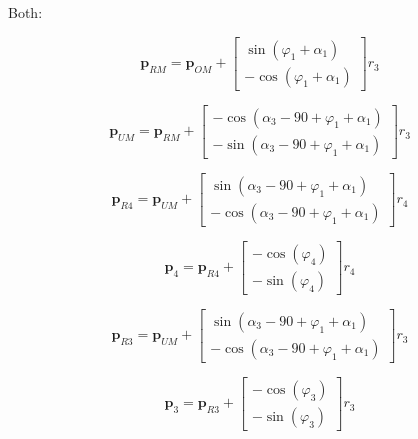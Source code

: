 \documentclass[letterpaper,10pt,conference]{ieeeconf}  %
\begin{document}
Both:

\begin{equation}
\bm{p}_{RM} = \bm{p}_{OM} + \begin{bmatrix} 
\sin(\varphi_1 + \alpha_1) \\ 
-\cos(\varphi_1 + \alpha_1) \end{bmatrix} r_3
\end{equation}


\begin{equation}
\bm{p}_{UM} = \bm{p}_{RM} + \begin{bmatrix} 
- \cos(\alpha_3 - 90 + \varphi_1 + \alpha_1) \\ 
- \sin(\alpha_3 - 90 + \varphi_1 + \alpha_1) \end{bmatrix} r_3
\end{equation}

\begin{equation}
\bm{p}_{R4} = \bm{p}_{UM} + \begin{bmatrix} 
\sin(\alpha_3 - 90 + \varphi_1 + \alpha_1) \\
- \cos(\alpha_3 - 90 + \varphi_1 + \alpha_1) \end{bmatrix} r_4
\end{equation}

\begin{equation}
\bm{p}_{4} = \bm{p}_{R4} + \begin{bmatrix} 
-\cos(\varphi_4) \\
-\sin(\varphi_4)\end{bmatrix} r_4
\end{equation}

\begin{equation}
\bm{p}_{R3} = \bm{p}_{UM} + \begin{bmatrix} 
\sin(\alpha_3 - 90 + \varphi_1 + \alpha_1) \\
 - \cos(\alpha_3 - 90 + \varphi_1 + \alpha_1) \end{bmatrix} r_3
\end{equation}

\begin{equation}
\bm{p}_{3} = \bm{p}_{R3} + \begin{bmatrix} 
- \cos(\varphi_3)\\
- \sin(\varphi_3)\end{bmatrix}r_3
\label{eq:F1_end}
\end{equation}
\end{document}
